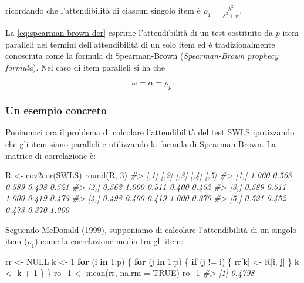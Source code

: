 \documentclass[
  11pt,
]{krantz}
\makeatletter
\newenvironment{Shaded}{\begin{snugshade}}{\end{snugshade}}
\newcommand{\AttributeTok}[1]{\textcolor[rgb]{0.61,0.61,0.61}{#1}}
\newcommand{\CommentTok}[1]{\textcolor[rgb]{0.37,0.37,0.37}{\textit{#1}}}
\newcommand{\ConstantTok}[1]{\textcolor[rgb]{0,0,0}{#1}}
\newcommand{\ControlFlowTok}[1]{\textcolor[rgb]{0.27,0.27,0.27}{\textbf{#1}}}
\newcommand{\DecValTok}[1]{\textcolor[rgb]{0.06,0.06,0.06}{#1}}
\newcommand{\FunctionTok}[1]{\textcolor[rgb]{0,0,0}{#1}}
\newcommand{\NormalTok}[1]{#1}
\newcommand{\OtherTok}[1]{\textcolor[rgb]{0.37,0.37,0.37}{#1}}
\newcommand{\SpecialCharTok}[1]{\textcolor[rgb]{0,0,0}{#1}}
\newenvironment{kframe}{%
\medskip{}
\setlength{\fboxsep}{.8em}
 \def\at@end@of@kframe{}%
 \ifinner\ifhmode%
  \def\at@end@of@kframe{\end{minipage}}%
  \begin{minipage}{\columnwidth}%
 \fi\fi%
 \def\FrameCommand##1{\hskip\@totalleftmargin \hskip-\fboxsep
 \colorbox{shadecolor}{##1}\hskip-\fboxsep
     \hskip-\linewidth \hskip-\@totalleftmargin \hskip\columnwidth}%
 \MakeFramed {\advance\hsize-\width
   \@totalleftmargin\z@ \linewidth\hsize
   \@setminipage}}%
 {\par\unskip\endMakeFramed%
 \at@end@of@kframe}
\renewenvironment{Shaded}{\begin{kframe}}{\end{kframe}}
\theoremstyle{definition}
\theoremstyle{definition}
\theoremstyle{definition}
\theoremstyle{definition}
\theoremstyle{remark}
\makeatother
\begin{document}
ricordando che l'attendibilità di ciascun singolo item è \(\rho_1 = \frac{\lambda^2}{\lambda^2 + \psi}\).

La \eqref{eq:spearman-brown-der} esprime l'attendibilità di un test costituito da \(p\) item paralleli nei termini dell'attendibilità di un solo item ed è tradizionalmente conosciuta come la formula di Spearman-Brown (\emph{Spearman-Brown prophecy formula}). Nel caso di item paralleli si ha che

\[
\omega=\alpha=\rho_p.
\]

\hypertarget{un-esempio-concreto-2}{%
\subsubsection{Un esempio concreto}\label{un-esempio-concreto-2}}

Poniamoci ora il problema di calcolare l'attendibilità del test SWLS ipotizzando che gli item siano paralleli e utilizzando la formula di Spearman-Brown. La matrice di correlazione è:

\begin{Shaded}
\begin{Highlighting}[]
\NormalTok{R }\OtherTok{\textless{}{-}} \FunctionTok{cov2cor}\NormalTok{(SWLS)}
\FunctionTok{round}\NormalTok{(R, }\DecValTok{3}\NormalTok{)}
\CommentTok{\#\textgreater{}       [,1]  [,2]  [,3]  [,4]  [,5]}
\CommentTok{\#\textgreater{} [1,] 1.000 0.563 0.589 0.498 0.521}
\CommentTok{\#\textgreater{} [2,] 0.563 1.000 0.511 0.400 0.452}
\CommentTok{\#\textgreater{} [3,] 0.589 0.511 1.000 0.419 0.473}
\CommentTok{\#\textgreater{} [4,] 0.498 0.400 0.419 1.000 0.370}
\CommentTok{\#\textgreater{} [5,] 0.521 0.452 0.473 0.370 1.000}
\end{Highlighting}
\end{Shaded}

Seguendo McDonald (1999), supponiamo di calcolare l'attendibilità di un singolo item (\(\rho_1\)) come la correlazione media tra gli item:

\begin{Shaded}
\begin{Highlighting}[]
\NormalTok{rr }\OtherTok{\textless{}{-}} \ConstantTok{NULL}
\NormalTok{k }\OtherTok{\textless{}{-}} \DecValTok{1}
\ControlFlowTok{for}\NormalTok{ (i }\ControlFlowTok{in} \DecValTok{1}\SpecialCharTok{:}\NormalTok{p) \{}
  \ControlFlowTok{for}\NormalTok{ (j }\ControlFlowTok{in} \DecValTok{1}\SpecialCharTok{:}\NormalTok{p) \{}
    \ControlFlowTok{if}\NormalTok{ (j }\SpecialCharTok{!=}\NormalTok{ i) \{}
\NormalTok{      rr[k] }\OtherTok{\textless{}{-}}\NormalTok{ R[i, j]}
\NormalTok{    \}}
\NormalTok{    k }\OtherTok{\textless{}{-}}\NormalTok{ k }\SpecialCharTok{+} \DecValTok{1}
\NormalTok{  \}}
\NormalTok{\}}
\NormalTok{ro\_1 }\OtherTok{\textless{}{-}} \FunctionTok{mean}\NormalTok{(rr, }\AttributeTok{na.rm =} \ConstantTok{TRUE}\NormalTok{)}
\NormalTok{ro\_1}
\CommentTok{\#\textgreater{} [1] 0.4798}
\end{Highlighting}
\end{Shaded}
\end{document}
